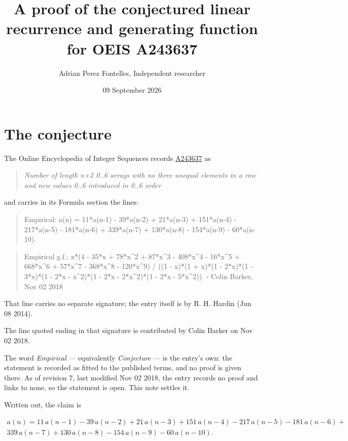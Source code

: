 \documentclass[11pt]{article}
\title{A proof of the conjectured linear recurrence and generating function for OEIS A243637}
\author{Adrian Perez Fontelles, Independent researcher}
\date{09 September 2026}
\theoremstyle{definition}
\begin{document}
\maketitle
\section{The conjecture}

The Online Encyclopedia of Integer Sequences records \href{https://oeis.org/A243637}{A243637} as

\begin{quote}\itshape Number of length n+2 0..6 arrays with no three unequal elements in a row and new values 0..6 introduced in 0..6 order\end{quote}

and carries in its Formula section the lines:

\begin{quote}\ttfamily Empirical: a(n) = 11*a(n-1) - 39*a(n-2) + 21*a(n-3) + 151*a(n-4) - 217*a(n-5) - 181*a(n-6) + 339*a(n-7) + 130*a(n-8) - 154*a(n-9) - 60*a(n-10).\end{quote}

\begin{quote}\ttfamily Empirical g.f.: x*(4 - 35*x + 78*x\textasciicircum{}2 + 87*x\textasciicircum{}3 - 408*x\textasciicircum{}4 - 16*x\textasciicircum{}5 + 668*x\textasciicircum{}6 + 57*x\textasciicircum{}7 - 368*x\textasciicircum{}8 - 120*x\textasciicircum{}9) / ((1 - x)*(1 + x)*(1 - 2*x)*(1 - 3*x)*(1 - 2*x - x\textasciicircum{}2)*(1 - 2*x - 2*x\textasciicircum{}2)*(1 - 2*x - 5*x\textasciicircum{}2)). - Colin Barker, Nov 02 2018\end{quote}

That line carries no separate signature; the entry itself is by R. H. Hardin (Jun 08 2014).

The line quoted ending in that signature is contributed by Colin Barker on Nov 02 2018.

The word {\itshape Empirical} --- equivalently {\itshape Conjecture} --- is the entry's own: the statement is recorded as fitted to the published terms, and no proof is given there. As of revision 7, last modified Nov 02 2018, the entry records no proof and links to none, so the statement is open. This note settles it.

Written out, the claim is

\begin{multline*} a(n) = 11\,a(n-1) - 39\,a(n-2) + 21\,a(n-3) + 151\,a(n-4) - 217\,a(n-5) - 181\,a(n-6) + \\ 339\,a(n-7) + 130\,a(n-8) - 154\,a(n-9) - 60\,a(n-10). \end{multline*}
\end{document}
